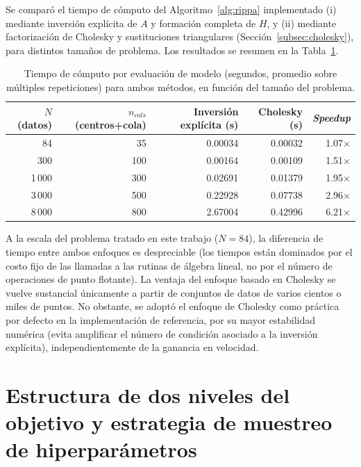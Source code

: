 \documentclass[11pt,a4paper]{article}
\begin{document}
Se compar\'o el tiempo de c\'omputo del Algoritmo~\ref{alg:rippa} implementado
(i) mediante inversi\'on expl\'icita de $A$ y formaci\'on completa de $H$, y
(ii) mediante factorizaci\'on de Cholesky y sustituciones triangulares
(Secci\'on~\ref{subsec:cholesky}), para distintos tama\~nos de problema. Los
resultados se resumen en la Tabla~\ref{tab:cholesky}.

\begin{table}[htbp]
\centering
\caption{Tiempo de c\'omputo por evaluaci\'on de modelo (segundos, promedio
sobre m\'ultiples repeticiones) para ambos m\'etodos, en funci\'on del tama\~no
del problema.}
\label{tab:cholesky}
\begin{tabular}{@{}rrrrr@{}}
\toprule
$N$ (datos) & $n_{cols}$ (centros+cola) & Inversi\'on expl\'icita (s) &
Cholesky (s) & \emph{Speedup} \\
\midrule
84    & 35  & 0.00034 & 0.00032 & 1.07$\times$ \\
300   & 100 & 0.00164 & 0.00109 & 1.51$\times$ \\
1\,000  & 300 & 0.02691 & 0.01379 & 1.95$\times$ \\
3\,000  & 500 & 0.22928 & 0.07738 & 2.96$\times$ \\
8\,000  & 800 & 2.67004 & 0.42996 & 6.21$\times$ \\
\bottomrule
\end{tabular}
\end{table}

A la escala del problema tratado en este trabajo ($N=84$), la diferencia de
tiempo entre ambos enfoques es despreciable (los tiempos est\'an dominados por
el costo fijo de las llamadas a las rutinas de \'algebra lineal, no por el
n\'umero de operaciones de punto flotante). La ventaja del enfoque basado en
Cholesky se vuelve sustancial \'unicamente a partir de conjuntos de datos de
varios cientos o miles de puntos. No obstante, se adopt\'o el enfoque de
Cholesky como pr\'actica por defecto en la implementaci\'on de referencia, por
su mayor estabilidad num\'erica (evita amplificar el n\'umero de condici\'on
asociado a la inversi\'on expl\'icita), independientemente de la ganancia en
velocidad.

\section{Estructura de dos niveles del objetivo y estrategia de muestreo
de hiperpar\'ametros}
\label{sec:dosniveles}
\end{document}
